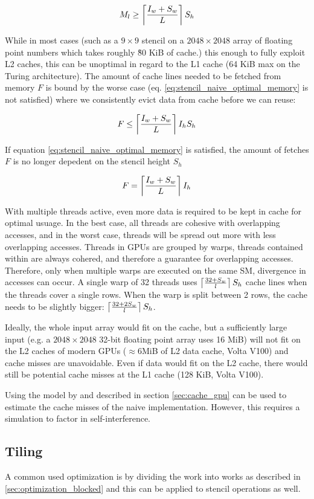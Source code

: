 \begin{equation}
    M_l \geq \left\lceil \frac{I_w + S_w}{L} \right\rceil S_h \label{eq:stencil_naive_optimal_memory}
\end{equation}

While in most cases (such as a $9\times9$ stencil on a $2048\times2048$ array of floating point numbers which takes roughly \~80 KiB of cache.) this enough to fully exploit L2 caches, this can be unoptimal in regard to the L1 cache (64 KiB max on the Turing architecture).
The amount of cache lines needed to be fetched from memory $F$ is bound by the worse case (eq. \ref{eq:stencil_naive_optimal_memory} is not satisfied) where we consistently evict data from cache before we can reuse:

\[
    F \leq \left\lceil \frac{I_w + S_w}{L} \right\rceil I_h S_h
\]

If equation \ref{eq:stencil_naive_optimal_memory} is satisfied, the amount of fetches $F$ is no longer depedent on the stencil height $S_h$

\[
    F = \left\lceil \frac{I_w + S_w}{L} \right\rceil I_h
\]

With multiple threads active, even more data is required to be kept in cache for optimal usuage.
In the best case, all threads are cohesive with overlapping accesses, and in the worst case, threads will be spread out more with less overlapping accesses.
Threads in GPUs are grouped by warps, threads contained within are always cohered, and therefore a guarantee for overlapping accesses.
Therefore, only when multiple warps are executed on the same SM, divergence in accesses can occur.
A single warp of 32 threads uses $\left\lceil \frac{32 + S_w}{l} \right\rceil S_h$ cache lines when the threads cover a single rows. 
When the warp is split between 2 rows, the cache needs to be slightly bigger: $\left\lceil \frac{32 + 2 S_w}{l} \right\rceil S_h$.

Ideally, the whole input array would fit on the cache, but a sufficiently large input (e.g. a $2048\times2048$ 32-bit floating point array uses 16 MiB) will not fit on the L2 caches of modern GPUs ($\approx6$MiB of L2 data cache, Volta V100) and cache misses are unavoidable.
Even if data would fit on the L2 cache, there would still be potential cache misses at the L1 cache (128 KiB, Volta V100).

Using the model by \citeauthor{lam1991cache} and described in section \ref{sec:cache_gpu} can be used to estimate the cache misses of the naive implementation.
However, this requires a simulation to factor in self-interference.

\subsection{Tiling}
\label{sec:stencil_tiled}
A common used optimization is by dividing the work into works as described in \ref{sec:optimization_blocked} and this can be applied to stencil operations as well.

